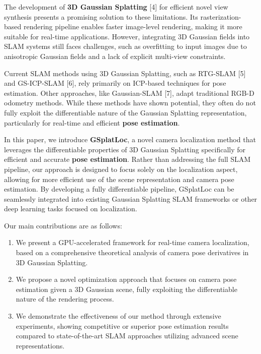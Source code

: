\documentclass[twocolumn]{article} %
\providecommand{\tightlist}{%
  \setlength{\itemsep}{0pt}\setlength{\parskip}{0pt}}
\begin{document}
The development of \textbf{3D Gaussian Splatting} {[}4{]} for efficient
novel view synthesis presents a promising solution to these limitations.
Its rasterization-based rendering pipeline enables faster image-level
rendering, making it more suitable for real-time applications. However,
integrating 3D Gaussian fields into SLAM systems still faces challenges,
such as overfitting to input images due to anisotropic Gaussian fields
and a lack of explicit multi-view constraints.

Current SLAM methods using 3D Gaussian Splatting, such as RTG-SLAM
{[}5{]} and GS-ICP-SLAM {[}6{]}, rely primarily on ICP-based techniques
for pose estimation. Other approaches, like Gaussian-SLAM {[}7{]}, adapt
traditional RGB-D odometry methods. While these methods have shown
potential, they often do not fully exploit the differentiable nature of
the Gaussian Splatting representation, particularly for real-time and
efficient \textbf{pose estimation}.

In this paper, we introduce \textbf{GSplatLoc}, a novel camera
localization method that leverages the differentiable properties of 3D
Gaussian Splatting specifically for efficient and accurate \textbf{pose
estimation}. Rather than addressing the full SLAM pipeline, our approach
is designed to focus solely on the localization aspect, allowing for
more efficient use of the scene representation and camera pose
estimation. By developing a fully differentiable pipeline, GSplatLoc can
be seamlessly integrated into existing Gaussian Splatting SLAM
frameworks or other deep learning tasks focused on localization.

Our main contributions are as follows:

\begin{enumerate}
\def\labelenumi{\arabic{enumi}.}
\tightlist
\item
  We present a GPU-accelerated framework for real-time camera
  localization, based on a comprehensive theoretical analysis of camera
  pose derivatives in 3D Gaussian Splatting.
\item
  We propose a novel optimization approach that focuses on camera pose
  estimation given a 3D Gaussian scene, fully exploiting the
  differentiable nature of the rendering process.
\item
  We demonstrate the effectiveness of our method through extensive
  experiments, showing competitive or superior pose estimation results
  compared to state-of-the-art SLAM approaches utilizing advanced scene
  representations.
\end{enumerate}
\end{document}
